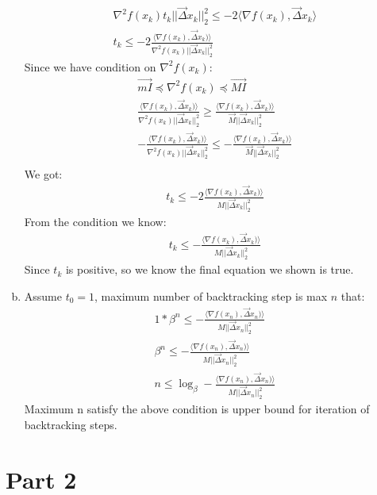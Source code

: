 \documentclass[12pt,twoside]{article}
\begin{document}
\begin{enumerate}[a)]
\begin{align}
\nabla^2 f(x_k)t_k||\vec{\Delta}x_k||_2^2 \leq - 2\langle\nabla f(x_k), \vec{\Delta}x_k\rangle\\
t_k \leq - 2\frac{\langle\nabla f(x_k), \vec{\Delta}x_k)\rangle}{\nabla^2 f(x_k)||\vec{\Delta}x_k||_2^2}
\end{align}
Since we have condition on $\nabla^2 f(x_k)$:
\begin{align}
\vec{mI} \preceq   \nabla^2 f(x_k) \preceq \vec{MI}\\
\frac{\langle\nabla f(x_k), \vec{\Delta}x_k)\rangle}{\nabla^2 f(x_k)||\vec{\Delta}x_k||_2^2} \geq \frac{\langle\nabla f(x_k), \vec{\Delta}x_k)\rangle}{\vec{M}||\vec{\Delta}x_k||_2^2}\\
- \frac{\langle\nabla f(x_k), \vec{\Delta}x_k)\rangle}{\nabla^2 f(x_k)||\vec{\Delta}x_k||_2^2} \leq - \frac{\langle\nabla f(x_k), \vec{\Delta}x_k)\rangle}{\vec{M}||\vec{\Delta}x_k||_2^2}\\
\end{align}
We got:
\begin{align}
t_k \leq - 2\frac{\langle\nabla f(x_k), \vec{\Delta}x_k)\rangle}{M||\vec{\Delta}x_k||_2^2}
\end{align}
From the condition we know:
\begin{align}
t_k \leq - \frac{\langle\nabla f(x_k), \vec{\Delta}x_k)\rangle}{M||\vec{\Delta}x_k||_2^2}
\end{align}
Since $t_k$ is positive, so we know the final equation we shown is true.\\

\item
Assume $t_0 = 1$, maximum number of backtracking step is max $n$ that:
\begin{align}
1 * \beta^n \leq - \frac{\langle\nabla f(x_n), \vec{\Delta}x_n)\rangle}{M||\vec{\Delta}x_n||_2^2}\\
\beta^n \leq - \frac{\langle\nabla f(x_n), \vec{\Delta}x_n)\rangle}{M||\vec{\Delta}x_n||_2^2}\\
n \leq \log_\beta - \frac{\langle\nabla f(x_n), \vec{\Delta}x_n)\rangle}{M||\vec{\Delta}x_n||_2^2}
\end{align}
Maximum n satisfy the above condition is upper bound for iteration of backtracking steps.




\end{enumerate}

\section{Part 2}
\end{document}
